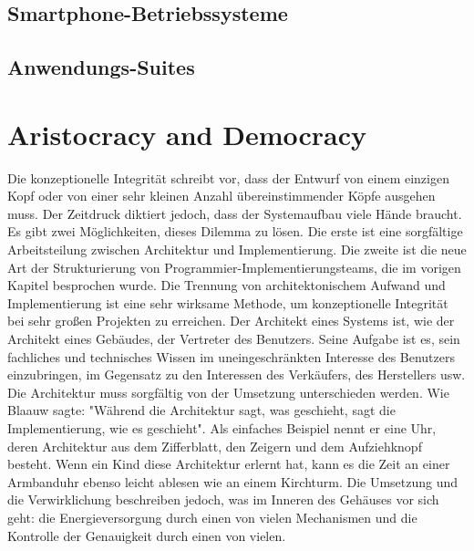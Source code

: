\documentclass[a4paper, ngerman, 12pt, usenames, dvipsnames]{article}
\begin{document}
\subsection{Smartphone-Betriebssysteme}

\subsection{Anwendungs-Suites}

\section{Aristocracy and Democracy}
Die konzeptionelle Integrität schreibt vor, dass der Entwurf von einem einzigen Kopf oder von einer sehr kleinen Anzahl übereinstimmender Köpfe ausgehen muss.
Der Zeitdruck diktiert jedoch, dass der Systemaufbau viele Hände braucht. Es gibt zwei Möglichkeiten, dieses Dilemma zu lösen. Die erste ist eine sorgfältige Arbeitsteilung zwischen Architektur und Implementierung. Die zweite ist die neue Art der Strukturierung von Programmier-Implementierungsteams, die im vorigen Kapitel besprochen wurde.
Die Trennung von architektonischem Aufwand und Implementierung ist eine sehr wirksame Methode, um konzeptionelle Integrität bei sehr großen Projekten zu erreichen.
Der Architekt eines Systems ist, wie der Architekt eines Gebäudes, der Vertreter des Benutzers. Seine Aufgabe ist es, sein fachliches und technisches Wissen im uneingeschränkten Interesse des Benutzers einzubringen, im Gegensatz zu den Interessen des Verkäufers, des Herstellers usw. Die Architektur muss sorgfältig von der Umsetzung unterschieden werden. Wie Blaauw sagte: "Während die Architektur sagt, was geschieht, sagt die Implementierung, wie es geschieht". Als einfaches Beispiel nennt er eine Uhr, deren Architektur aus dem Zifferblatt, den Zeigern und dem Aufziehknopf besteht. Wenn ein Kind diese Architektur erlernt hat, kann es die Zeit an einer Armbanduhr ebenso leicht ablesen wie an einem Kirchturm. Die Umsetzung und die Verwirklichung beschreiben jedoch, was im Inneren des Gehäuses vor sich geht: die Energieversorgung durch einen von vielen Mechanismen und die Kontrolle der Genauigkeit durch einen von vielen.
\end{document}
